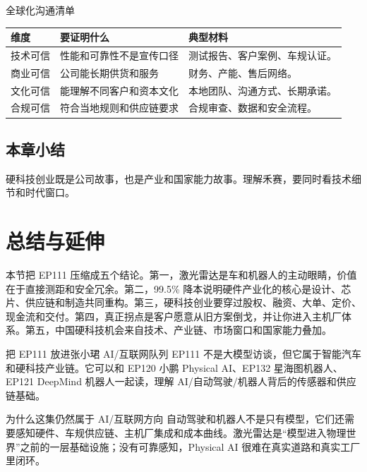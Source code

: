 \documentclass[a4paper]{article}
\begin{document}
\begin{knowledgebox}{全球化沟通清单}
\begin{tabularx}{\textwidth}{p{}p{}X}
\toprule
维度 & 要证明什么 & 典型材料 \\
\midrule
技术可信 & 性能和可靠性不是宣传口径 & 测试报告、客户案例、车规认证。 \\
商业可信 & 公司能长期供货和服务 & 财务、产能、售后网络。 \\
文化可信 & 能理解不同客户和资本文化 & 本地团队、沟通方式、长期承诺。 \\
合规可信 & 符合当地规则和供应链要求 & 合规审查、数据和安全流程。 \\
\bottomrule
\end{tabularx}
\end{knowledgebox}

\subsection{本章小结}

硬科技创业既是公司故事，也是产业和国家能力故事。理解禾赛，要同时看技术细节和时代窗口。

\section{总结与延伸}

本节把 EP111 压缩成五个结论。第一，激光雷达是车和机器人的主动眼睛，价值在于直接测距和安全冗余。第二，99.5\% 降本说明硬件产业化的核心是设计、芯片、供应链和制造共同重构。第三，硬科技创业要穿过股权、融资、大单、定价、现金流和交付。第四，真正拐点是客户愿意从旧方案倒戈，并让你进入主机厂体系。第五，中国硬科技机会来自技术、产业链、市场窗口和国家能力叠加。

\begin{importantbox}{把 EP111 放进张小珺 AI/互联网队列}
EP111 不是大模型访谈，但它属于智能汽车和硬科技产业链。它可以和 EP120 小鹏 Physical AI、EP132 星海图机器人、EP121 DeepMind 机器人一起读，理解 AI/自动驾驶/机器人背后的传感器和供应链基础。
\end{importantbox}

\begin{knowledgebox}{为什么这集仍然属于 AI/互联网方向}
自动驾驶和机器人不是只有模型，它们还需要感知硬件、车规供应链、主机厂集成和成本曲线。激光雷达是“模型进入物理世界”之前的一层基础设施；没有可靠感知，Physical AI 很难在真实道路和真实工厂里闭环。
\end{knowledgebox}
\end{document}
